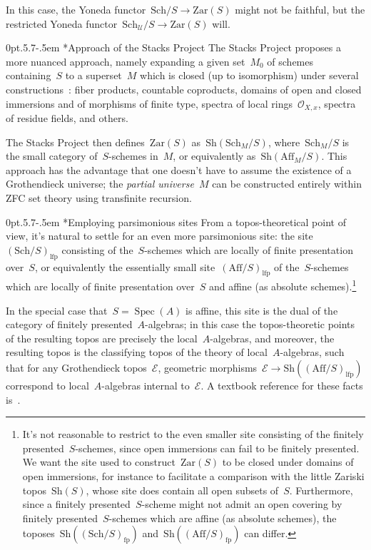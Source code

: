 \documentclass[10pt,reqno,a4paper]{amsbook}
\makeatletter
\theoremstyle{definition}
\theoremstyle{plain}
\theoremstyle{remark}
\newcommand{\E}{\mathcal{E}}
\renewcommand{\O}{\mathcal{O}}
\newcommand{\U}{\mathcal{U}}
\newcommand{\Sh}{\mathrm{Sh}}
\newcommand{\Zar}{\mathrm{Zar}}
\newcommand{\Sch}{\mathrm{Sch}}
\newcommand{\Aff}{\mathrm{Aff}}
\newcommand{\lfp}{\mathrm{lfp}}
\newcommand{\fp}{\mathrm{fp}}
\DeclareMathOperator{\Spec}{Spec}
\newcommand{\?}{\,{:}\,}
\renewcommand{\_}{\mathpunct{.}\,}
\def\subsection{\@startsection{subsection}{2}%
  {0pt}{.5\linespacing\@plus.7\linespacing}{-.5em}%
  {\normalfont\bfseries}}
\makeatother
\begin{document}
{In this case, the Yoneda functor~$\Sch/S \to \Zar(S)$ might not be faithful,
but the restricted Yoneda functor~$\Sch_\U/S \to \Zar(S)$ will.

\subsection*{Approach of the Stacks Project}
The Stacks Project proposes a more nuanced approach, namely expanding a given
set~$M_0$ of schemes containing~$S$ to a superset~$M$ which is closed (up to
isomorphism) under several constructions~\cite[Tag~000H]{stacks-project}: fiber
products, countable coproducts, domains of open and closed immersions and of
morphisms of finite type, spectra of local rings~$\O_{X,x}$, spectra of residue
fields, and others.

The Stacks Project then defines~$\Zar(S)$ as~$\Sh(\Sch_M/S)$, where~$\Sch_M/S$
is the small category of~$S$-schemes in~$M$, or equivalently
as~$\Sh(\Aff_M/S)$. This approach has the advantage that one doesn't have to
assume the existence of a Grothendieck universe; the \emph{partial
universe}~$M$ can be constructed entirely within ZFC set theory using
transfinite recursion.

\subsection*{Employing parsimonious sites}
From a topos-theoretical point of view, it's natural to settle for an even
more parsimonious site: the site~$(\Sch/S)_\lfp$ consisting of the~$S$-schemes
which are locally of finite presentation over~$S$, or equivalently the
essentially small site~$(\Aff/S)_\lfp$ of the~$S$-schemes which are locally of
finite presentation over~$S$ and affine (as absolute schemes).\footnote{It's
not reasonable to restrict to the even smaller site consisting of the finitely
presented~$S$-schemes, since open immersions can fail to be finitely presented.
We want the site used to construct~$\Zar(S)$ to be closed under domains of open immersions,
for instance to facilitate a comparison with the little
Zariski topos~$\Sh(S)$, whose site does contain all open subsets of~$S$.
Furthermore, since a finitely presented~$S$-scheme might not admit an open
covering by finitely presented~$S$-schemes which are affine (as absolute
schemes), the toposes~$\Sh((\Sch/S)_\fp)$ and~$\Sh((\Aff/S)_\fp)$ can differ.}

In the special case that~$S = \Spec(A)$ is affine, this site is the
dual of the category of finitely presented~$A$-algebras; in this case the
topos-theoretic points of the resulting topos are precisely the local~$A$-algebras,
and moreover, the resulting topos is the classifying topos of the theory of
local~$A$-algebras, such that for any Grothendieck topos~$\E$, geometric
morphisms~$\E \to \Sh((\Aff/S)_\lfp)$ correspond to local~$A$-algebras internal
to~$\E$. A textbook reference for these facts
is~\cite[Section~VIII.6]{moerdijk-maclane:sheaves-logic}.

}
\end{document}
